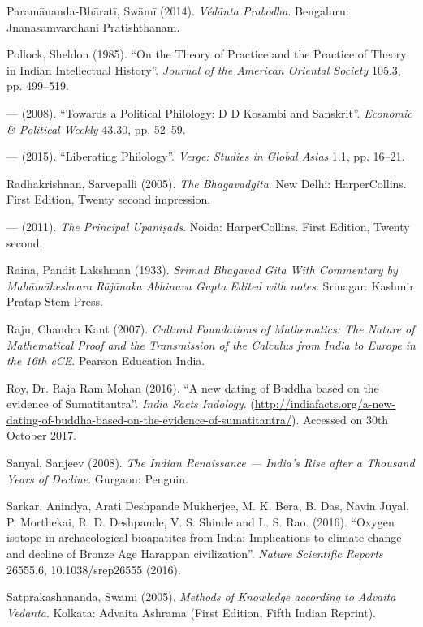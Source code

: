 \begin{thebibliography}{99}
Paramānanda-Bhāratī, Swāmī (2014). {\sl Védānta Prabodha}. Bengaluru: Jnanasamvardhani Pratishthanam.

Pollock, Sheldon (1985). ``On the Theory of Practice and the Practice of Theory in Indian Intellectual History''. {\sl Journal of the American Oriental Society} 105.3, pp. 499--519.

--- (2008). ``Towards a Political Philology: D D Kosambi and Sanskrit''. {\sl Economic \& Political Weekly} 43.30, pp. 52--59.

--- (2015). ``Liberating Philology''. {\sl Verge: Studies in Global Asias} 1.1, pp. 16--21.

Radhakrishnan, Sarvepalli (2005). {\sl The Bhagavadgita}. New Delhi: HarperCollins. First Edition, Twenty second impression.

--- (2011). {\sl The Principal Upaniṣads}. Noida: HarperCollins. First Edition, Twenty second.

Raina, Pandit Lakshman (1933). {\sl Srimad Bhagavad Gita With Commentary by Mahāmāheshvara Rājānaka Abhinava Gupta Edited with notes}. Srinagar: Kashmir Pratap Stem Press.

Raju, Chandra Kant (2007). {\sl Cultural Foundations of Mathematics: The Nature of Mathematical Proof and the Transmission of the Calculus from India to Europe in the 16th cCE}. Pearson Education India.

Roy, Dr. Raja Ram Mohan (2016). ``A new dating of Buddha based on the evidence of Sumatitantra''. {\sl India Facts Indology}.
(\url{http://indiafacts.org/a-new-dating-of-buddha-based-on-the-evidence-of-sumatitantra/}). Accessed on 30th October 2017. 

Sanyal, Sanjeev (2008). {\sl The Indian Renaissance --- India's Rise after a Thousand Years of Decline}. Gurgaon: Penguin.

Sarkar, Anindya, Arati Deshpande Mukherjee, M. K. Bera, B. Das, Navin Juyal, P. Morthekai, R. D. Deshpande, V. S. Shinde and L. S. Rao. (2016). ``Oxygen isotope in archaeological bioapatites from India: Implications to climate change and decline of Bronze Age Harappan civilization''. {\sl Nature Scientific Reports} 26555.6, 10.1038/srep26555 (2016).

Satprakashananda, Swami (2005). {\sl Methods of Knowledge according to Advaita Vedanta}. Kolkata: 
Advaita Ashrama (First Edition, Fifth Indian Reprint).


\end{thebibliography}
